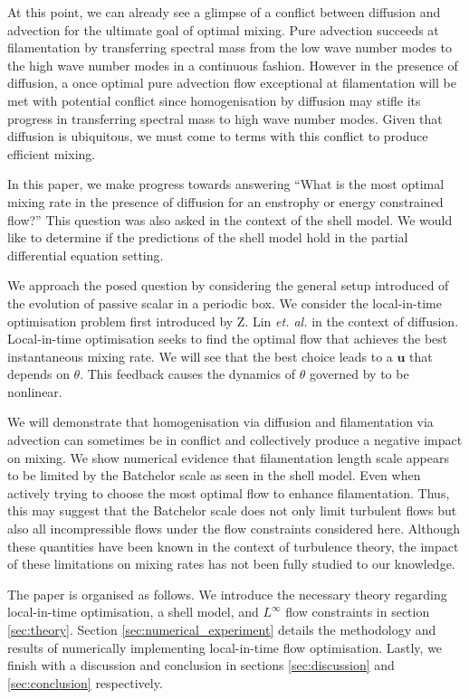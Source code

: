 \documentclass[12pt]{iopart}
\renewcommand{\vec}[1]{\mathbf{#1}}
\begin{document}
At this point, we can already see a glimpse of a conflict between diffusion and advection for the ultimate goal of optimal mixing. Pure advection succeeds at filamentation by transferring spectral mass from the low wave number modes to the high wave number modes in a continuous fashion. However in the presence of diffusion, a once optimal pure advection flow exceptional at filamentation will be met with potential conflict since homogenisation by diffusion may stifle its progress in transferring spectral mass to high wave number modes. Given that diffusion is ubiquitous, we must come to terms with this conflict to produce efficient mixing.

In this paper, we make progress towards answering ``What is the most optimal mixing rate in the presence of diffusion for an enstrophy or energy constrained flow?'' This question was also asked in the context of the shell model. We would like to determine if the predictions of the shell model hold in the partial differential equation setting. 

We approach the posed question by considering the general setup introduced of the evolution of passive scalar in a periodic box. We consider the local-in-time optimisation problem first introduced by Z. Lin {\it et. al.} \cite{JFM2011} in the context of diffusion. Local-in-time optimisation seeks to find the optimal flow that achieves the best instantaneous mixing rate. We will see that the best choice leads to a $\vec{u}$ that depends on $\theta$. This feedback causes the dynamics of $\theta$ governed by  to be nonlinear.

We will demonstrate that homogenisation via diffusion and filamentation via advection can sometimes be in conflict and collectively produce a negative impact on mixing. We show numerical evidence that filamentation length scale appears to be limited by the Batchelor scale as seen in the shell model. Even when actively trying to choose the most optimal flow to enhance filamentation. Thus, this may suggest that the Batchelor scale does not only limit turbulent flows but also all incompressible flows under the flow constraints considered here. Although these quantities have been known in the context of turbulence theory, the impact of these limitations on mixing rates has not been fully studied to our knowledge.


The paper is organised as follows. We introduce the necessary theory regarding local-in-time optimisation, a shell model, and $L^{\infty}$ flow constraints in section \ref{sec:theory}. Section \ref{sec:numerical_experiment} details the methodology and results of numerically implementing local-in-time flow optimisation. Lastly, we finish with a discussion and conclusion in sections \ref{sec:discussion} and \ref{sec:conclusion} respectively.
\end{document}
